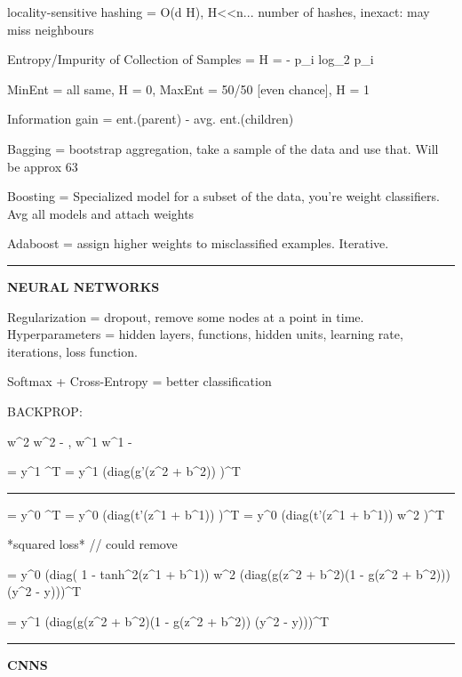 \documentclass[a4paper,twoside,twocolumn]{article}
\begin{document}
{{locality-sensitive hashing = O(d H), H<<n... number of hashes, inexact: may miss neighbours

Entropy/Impurity of Collection of Samples = H = \Sigma - p_i log_2 p_i

MinEnt = all same, H = 0, MaxEnt = 50/50 [even chance], H = 1

Information gain = ent.(parent) - avg. ent.(children)

Bagging = bootstrap aggregation, take a sample of the data and use that. Will be approx 63%

Boosting = Specialized model for a subset of the data, you're weight classifiers. Avg all models and attach weights

Adaboost = assign higher weights to misclassified examples. Iterative.

\noindent\rule{8cm}{0.4pt}
}

\textbf{NEURAL NETWORKS}

\setlength{\parindent}{0pt}
{\scriptsize

Regularization = dropout, remove some nodes at a point in time. Hyperparameters = hidden layers, functions, hidden units, learning rate, iterations, loss function.

Softmax + Cross-Entropy = better classification

BACKPROP:

w^2 \leftarrow w^2 - \eta * , w^1 \leftarrow w^1 - \eta * 

 = y^{1} ^T
 = y^1 (diag(g'(z^2 + b^2)) \cdot {})^T

\noindent\rule{8cm}{0.4pt}

 = y^{0} ^T
 = y^0 (diag(t'(z^1 + b^1)) \cdot {})^T
 = y^0 (diag(t'(z^1 + b^1)) \cdot w^2 \cdot {})^T

*squared loss* // could remove

 = y^0 (diag( 1 - tanh^2(z^1 + b^1)) \cdot w^2 \cdot (diag(g(z^2 + b^2)(1 - g(z^2 + b^2))) \cdot (y^2 - y)))^T

 = y^1 (diag(g(z^2 + b^2)(1 - g(z^2 + b^2)) \cdot (y^2 - y)))^T

\noindent\rule{8cm}{0.4pt}
}

\textbf{CNNS}

\setlength{\parindent}{0pt}
{\scriptsize

}}
\end{document}
